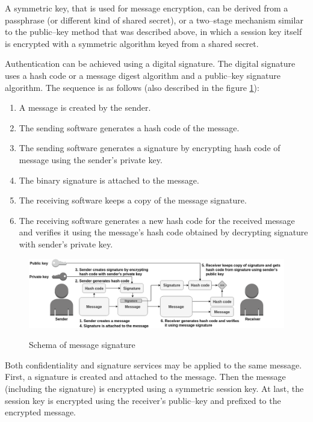 A symmetric key, that is used for message encryption, can be derived from a passphrase (or different kind of shared secret), or a two--stage mechanism similar to the public--key method that was described above, in which a session key itself is encrypted with a symmetric algorithm keyed from a shared secret.

Authentication can be achieved using a digital signature. The digital signature uses a hash code or a message digest algorithm and a public--key signature algorithm. The sequence is as follows (also described in the figure \ref{img:messageSignature}):
\begin{enumerate}
    \item A message is created by the sender.
    \item The sending software generates a hash code of the message.
    \item The sending software generates a signature by encrypting hash code of message using the sender's private key.
    \item The binary signature is attached to the message.
    \item The receiving software keeps a copy of the message signature.
    \item The receiving software generates a new hash code for the received message and verifies it using the message's hash code obtained by decrypting signature with sender's private key.
\end{enumerate}

\begin{figure}[H]
    \begin{center}
        \label{img:messageSignature}
        \includegraphics[width=1.0\textwidth]{obrazky-figures/messageSignature.png}
        \caption{Schema of message signature}
    \end{center}
\end{figure}

Both confidentiality and signature services may be applied to the same message. First, a signature is created and attached to the message. Then the message (including the signature) is encrypted using a symmetric session key. At last, the session key is encrypted using the receiver's public--key and prefixed to the encrypted message.

